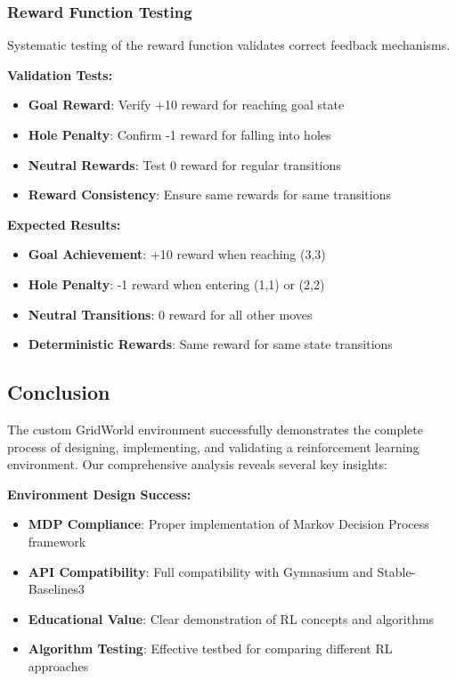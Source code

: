 \documentclass[12pt]{article}
\begin{document}
{{{\subsubsection{Reward Function Testing}

Systematic testing of the reward function validates correct feedback mechanisms.

\textbf{Validation Tests:}
\begin{itemize}
    \item \textbf{Goal Reward}: Verify +10 reward for reaching goal state
    \item \textbf{Hole Penalty}: Confirm -1 reward for falling into holes
    \item \textbf{Neutral Rewards}: Test 0 reward for regular transitions
    \item \textbf{Reward Consistency}: Ensure same rewards for same transitions
\end{itemize}

\textbf{Expected Results:}
\begin{itemize}
    \item \textbf{Goal Achievement}: +10 reward when reaching (3,3)
    \item \textbf{Hole Penalty}: -1 reward when entering (1,1) or (2,2)
    \item \textbf{Neutral Transitions}: 0 reward for all other moves
    \item \textbf{Deterministic Rewards}: Same reward for same state transitions
\end{itemize}

\subsection{Conclusion}

The custom GridWorld environment successfully demonstrates the complete process of designing, implementing, and validating a reinforcement learning environment. Our comprehensive analysis reveals several key insights:

\textbf{Environment Design Success:}
\begin{itemize}
    \item \textbf{MDP Compliance}: Proper implementation of Markov Decision Process framework
    \item \textbf{API Compatibility}: Full compatibility with Gymnasium and Stable-Baselines3
    \item \textbf{Educational Value}: Clear demonstration of RL concepts and algorithms
    \item \textbf{Algorithm Testing}: Effective testbed for comparing different RL approaches
\end{itemize}

}}}
\end{document}
